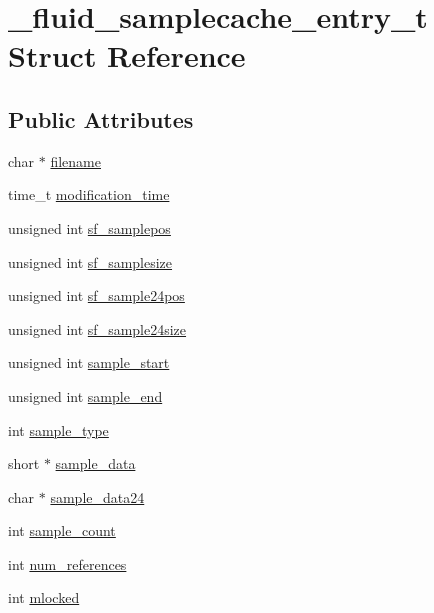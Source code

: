 \hypertarget{struct__fluid__samplecache__entry__t}{}\section{\+\_\+fluid\+\_\+samplecache\+\_\+entry\+\_\+t Struct Reference}
\label{struct__fluid__samplecache__entry__t}
\subsection*{Public Attributes}
\begin{DoxyCompactItemize}
\item 
char $\ast$ \hyperlink{struct__fluid__samplecache__entry__t_a52440e5bc949027b94d169d271a5dbea}{filename}
\item 
time\+\_\+t \hyperlink{struct__fluid__samplecache__entry__t_a7fd7f02a2078d71dc48283ab55ae2c3f}{modification\+\_\+time}
\item 
unsigned int \hyperlink{struct__fluid__samplecache__entry__t_a9cf346ac1e4ca8c23d7ba4b37613fc83}{sf\+\_\+samplepos}
\item 
unsigned int \hyperlink{struct__fluid__samplecache__entry__t_a3e33a203f4fe8ced406f8bfed851f345}{sf\+\_\+samplesize}
\item 
unsigned int \hyperlink{struct__fluid__samplecache__entry__t_aab092587cf9907d7cb77384c65e90797}{sf\+\_\+sample24pos}
\item 
unsigned int \hyperlink{struct__fluid__samplecache__entry__t_a01e469ec27aeaf6dfe2d446f047d2e20}{sf\+\_\+sample24size}
\item 
unsigned int \hyperlink{struct__fluid__samplecache__entry__t_a03f7181f725fafac203131997fa1f97a}{sample\+\_\+start}
\item 
unsigned int \hyperlink{struct__fluid__samplecache__entry__t_a0c1b54067e105c799f73c4af527fa2f8}{sample\+\_\+end}
\item 
int \hyperlink{struct__fluid__samplecache__entry__t_ae9e20a09a26c83988564e0f5dadcebf0}{sample\+\_\+type}
\item 
short $\ast$ \hyperlink{struct__fluid__samplecache__entry__t_a6de64380849f6008d22c450721850969}{sample\+\_\+data}
\item 
char $\ast$ \hyperlink{struct__fluid__samplecache__entry__t_a0b6b2d56ca4cdefe037802e85f57a032}{sample\+\_\+data24}
\item 
int \hyperlink{struct__fluid__samplecache__entry__t_a243272fe55f42aa9236a77490804f7d6}{sample\+\_\+count}
\item 
int \hyperlink{struct__fluid__samplecache__entry__t_a1cb50e3307f51d9f7cc73e99060392ac}{num\+\_\+references}
\item 
int \hyperlink{struct__fluid__samplecache__entry__t_aebc7a0970039be60985b2565b9cdc90b}{mlocked}
\end{DoxyCompactItemize}


